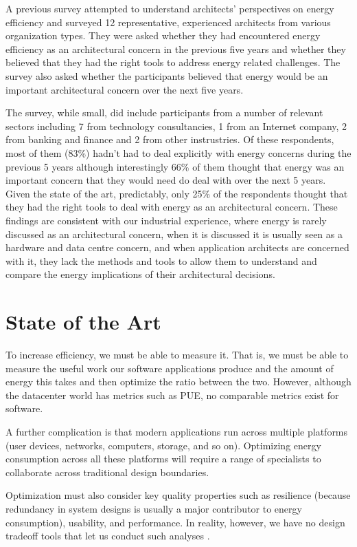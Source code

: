 A previous survey attempted to understand architects' perspectives on energy efficiency \cite{bashroush2016-datacentreenergy} and surveyed 12 representative, experienced architects from various organization types. They were asked whether they had encountered energy efficiency as an architectural concern in the previous five years and whether they believed that they had the right tools to address energy related challenges. The survey also asked whether the participants believed that energy would be an important architectural concern over the next five years.

The survey, while small, did include participants from a number of relevant sectors including 7 from technology consultancies, 1 from an Internet company, 2 from banking and finance and 2 from other instrustries.  Of these respondents, most of them (83\%) hadn't had to deal explicitly with energy concerns during the previous 5 years although interestingly 66\% of them thought that energy was an important concern that they would need do deal with over the next 5 years.  Given the state of the art, predictably, only 25\% of the respondents thought that they had the right tools to deal with energy as an architectural concern.  These findings are consistent with our industrial experience, where energy is rarely discussed as an architectural concern, when it is discussed it is usually seen as a hardware and data centre concern, and when application architects are concerned with it, they lack the methods and tools to allow them to understand and compare the energy implications of their architectural decisions.

\section{State of the Art}

To increase efficiency, we must be able to measure it. That is, we must be able to measure the useful work our software applications produce and the amount of energy this takes and then optimize the ratio between the two. However, although the datacenter world has metrics such as PUE, no comparable metrics exist for software.

A further complication is that modern applications run across multiple platforms (user devices, networks, computers, storage, and so on). Optimizing energy consumption across all these platforms will require a range of specialists to collaborate across traditional design boundaries.

Optimization must also consider key quality properties such as resilience (because redundancy in system designs is usually a major contributor to energy consumption), usability, and performance. In reality, however, we have no design tradeoff tools that let us conduct such analyses \cite{bashroush2016-datacentreenergy}.

